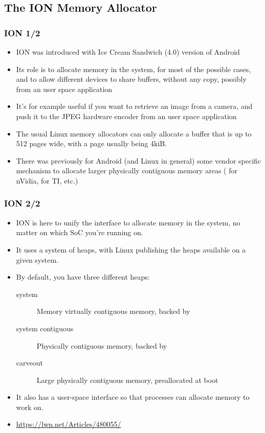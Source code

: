 \subsection{The ION Memory Allocator}
\begin{frame}
  \frametitle{ION 1/2}
  \begin{itemize}
  \item ION was introduced with Ice Cream Sandwich (4.0) version of
    Android
  \item Its role is to allocate memory in the system, for most of the
    possible cases, and to allow different devices to share buffers,
    without any copy, possibly from an user space application
  \item It's for example useful if you want to retrieve an image from
    a camera, and push it to the JPEG hardware encoder from an
    user space application
  \item The usual Linux memory allocators can only allocate a buffer
    that is up to 512 pages wide, with a page usually being 4kiB.
  \item There was previously for Android (and Linux in general) some
    vendor specific mechanism to allocate larger physically contiguous
    memory areas ( for nVidia,  for TI, etc.)
  \end{itemize}
\end{frame}

\begin{frame}
  \frametitle{ION 2/2}
  \begin{itemize}
  \item ION is here to unify the interface to allocate memory in the
    system, no matter on which SoC you're running on.
  \item It uses a system of heaps, with Linux publishing the heaps
    available on a given system.
  \item By default, you have three different heaps:
    \begin{description}
    \item[system] Memory virtually contiguous memory, backed by
    \item[system contiguous] Physically contiguous memory, backed by
    \item[carveout] Large physically contiguous memory, preallocated
      at boot
    \end{description}
  \item It also has a user-space interface so that processes can
    allocate memory to work on.
  \item \url{https://lwn.net/Articles/480055/}
  \end{itemize}
\end{frame}

